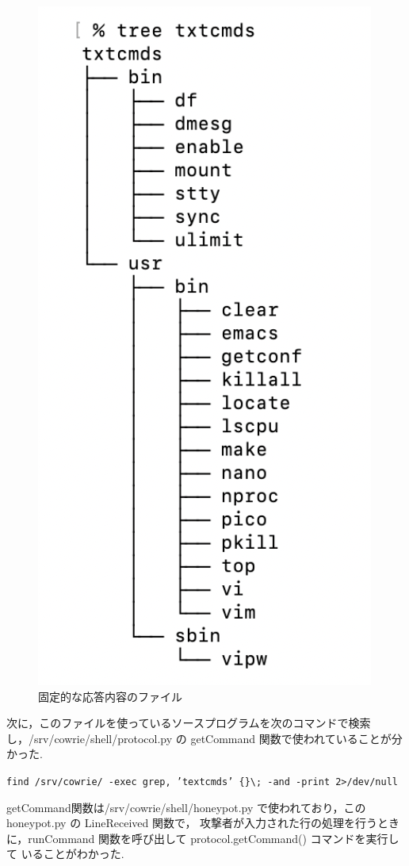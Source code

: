 \documentclass[dvipdfmx]{bta}
\begin{document}
\begin{figure}[htbp]
	\centering
 	\includegraphics[scale=0.7]{txtcmds.png}
 	\caption{固定的な応答内容のファイル}\label{fig:textcmds}
\end{figure}

次に，このファイルを使っているソースプログラムを次のコマンドで検索し，/srv/cowrie/shell/protocol.py の
getCommand 関数で使われていることが分かった.

\verb!find /srv/cowrie/ -exec grep, ’textcmds’ {}\; -and -print 2>/dev/null!

getCommand関数は/srv/cowrie/shell/honeypot.py で使われており，この honeypot.py の LineReceived 関数で， 攻撃者が入力された行の処理を行うときに，runCommand 関数を呼び出して protocol.getCommand() コマンドを実行して いることがわかった.
\end{document}
